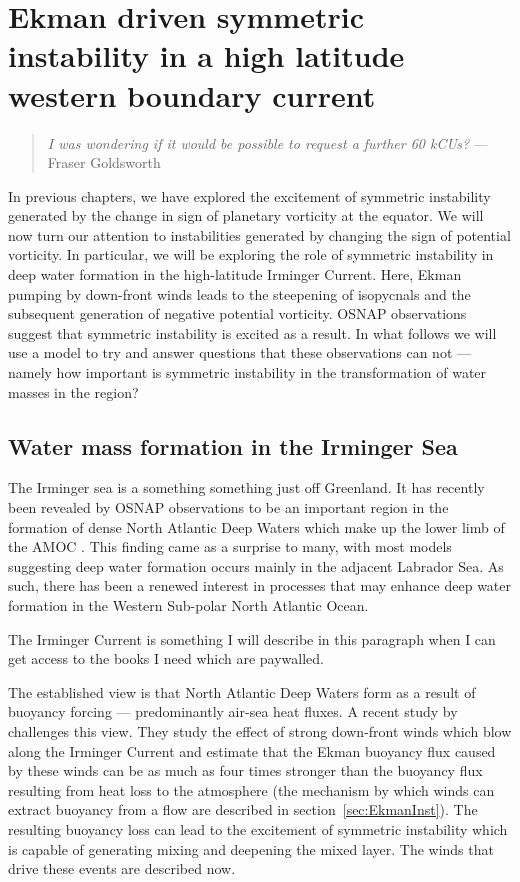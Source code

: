 \chapter{Ekman driven symmetric instability in a high latitude western boundary current}
\label{chap:5}
\begin{quote}
    \textit{I was wondering if it would be possible to request a further 60 kCUs?} --- Fraser Goldsworth
\end{quote}

In previous chapters, we have explored the excitement of symmetric instability generated by the change in sign of planetary vorticity at the equator. We will now turn our attention to instabilities generated by changing the sign of potential vorticity. In particular, we will be exploring the role of symmetric instability in deep water formation in the high-latitude Irminger Current. Here, Ekman pumping by down-front winds leads to the steepening of isopycnals and the subsequent generation of negative potential vorticity. OSNAP observations suggest that symmetric instability is excited as a result. In what follows we will use a model to try and answer questions that these observations can not --- namely how important is symmetric instability in the transformation of water masses in the region?

\section{Water mass formation in the Irminger Sea}
The Irminger sea is a something something just off Greenland.
It has recently been revealed by OSNAP observations to be an important region in the formation of dense North Atlantic Deep Waters which make up the lower limb of the AMOC \citet{Lozier2019}. This finding came as a surprise to many, with most models suggesting deep water formation occurs mainly in the adjacent Labrador Sea. As such, there has been a renewed interest in processes that may enhance deep water formation in the Western Sub-polar North Atlantic Ocean.

The Irminger Current is something I will describe in this paragraph when I can get access to the books I need which are paywalled.

The established view is that North Atlantic Deep Waters form as a result of buoyancy forcing --- predominantly air-sea heat fluxes. A recent study by \citet{LeBras2022} challenges this view. They study the effect of strong down-front winds which blow along the Irminger Current and estimate that the Ekman buoyancy flux caused by these winds can be as much as four times stronger than the buoyancy flux resulting from heat loss to the atmosphere (the mechanism by which winds can extract buoyancy from a flow are described in section~\ref{sec:EkmanInst}). The resulting buoyancy loss can lead to the excitement of symmetric instability which is capable of generating mixing and deepening the mixed layer. The winds that drive these events are described now.

